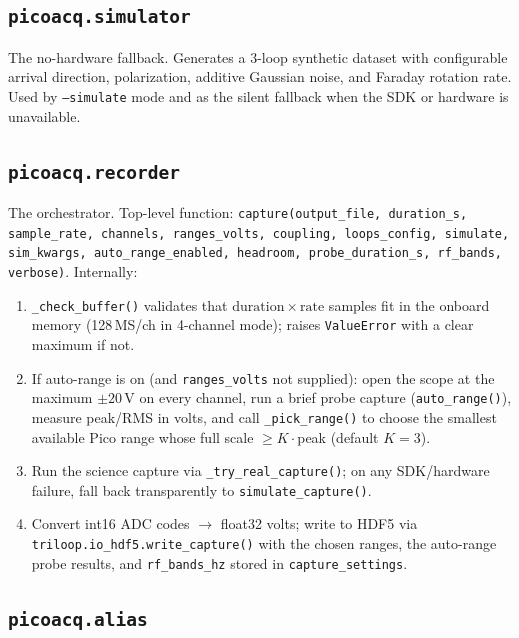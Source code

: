 \documentclass[11pt]{article}
\begin{document}
\subsection{\texttt{picoacq.simulator}}

The no-hardware fallback.  Generates a 3-loop synthetic dataset with
configurable arrival direction, polarization, additive Gaussian noise,
and Faraday rotation rate.  Used by \texttt{--simulate} mode and as
the silent fallback when the SDK or hardware is unavailable.

\subsection{\texttt{picoacq.recorder}}

The orchestrator.  Top-level function:
\texttt{capture(output\_file, duration\_s, sample\_rate, channels,
ranges\_volts, coupling, loops\_config, simulate, sim\_kwargs,
auto\_range\_enabled, headroom, probe\_duration\_s, rf\_bands,
verbose)}.  Internally:

\begin{enumerate}\itemsep=2pt
\item \texttt{\_check\_buffer()} validates that
      $\mathrm{duration}\times\mathrm{rate}$ samples fit in the
      onboard memory (128\,MS/ch in 4-channel mode); raises
      \texttt{ValueError} with a clear maximum if not.
\item If auto-range is on (and \texttt{ranges\_volts} not supplied):
      open the scope at the maximum $\pm 20$\,V on every channel,
      run a brief probe capture (\texttt{auto\_range()}), measure
      peak/RMS in volts, and call \texttt{\_pick\_range()} to choose
      the smallest available Pico range whose full scale
      $\geq K\cdot$peak (default $K = 3$).
\item Run the science capture via \texttt{\_try\_real\_capture()};
      on any SDK/hardware failure, fall back transparently to
      \texttt{simulate\_capture()}.
\item Convert int16 ADC codes $\to$ float32 volts; write to HDF5 via
      \texttt{triloop.io\_hdf5.write\_capture()} with the chosen
      ranges, the auto-range probe results, and \texttt{rf\_bands\_hz}
      stored in \texttt{capture\_settings}.
\end{enumerate}

\subsection{\texttt{picoacq.alias}}
\label{sec:alias}
\end{document}

